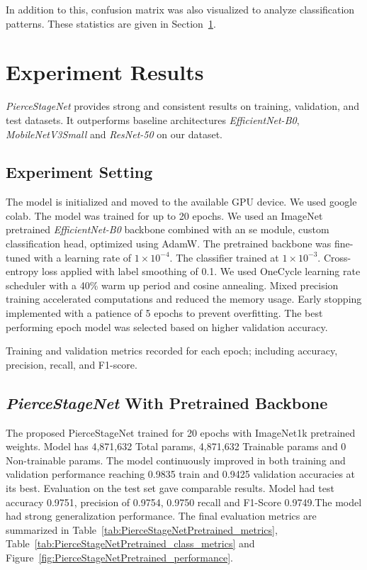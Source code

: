 \documentclass[conference]{IEEEtran}
\begin{document}
In addition to this, confusion matrix was also visualized to analyze classification patterns. These statistics are given in Section~\ref{sec:results}.

\section{Experiment Results}
\label{sec:results}
\textit{PierceStageNet} provides strong and consistent results on training, validation, and test datasets. It outperforms baseline architectures \textit{EfficientNet-B0}, \textit{MobileNetV3Small} and \textit{ResNet-50} on our dataset.

\subsection{Experiment Setting}
The model is initialized and moved to the available GPU device. We used google colab. The model was trained for up to 20 epochs. We used an ImageNet pretrained \textit{EfficientNet-B0} backbone combined with an \ac{se} module, custom classification head, optimized using AdamW. The pretrained backbone was fine-tuned with a learning rate of $1\times10^{-4}$. The classifier trained at $1\times10^{-3}$.  Cross-entropy loss applied with label smoothing of 0.1. We used OneCycle learning rate scheduler with a 40\% warm up period and cosine annealing. Mixed precision training accelerated computations and reduced the memory usage. Early stopping implemented with a patience of 5 epochs to prevent overfitting. The best performing epoch model was selected based on higher validation accuracy.

Training and validation metrics recorded for each epoch; including accuracy, precision, recall, and F1-score.

\subsection{\textit{PierceStageNet} With Pretrained Backbone}
The proposed PierceStageNet trained for 20 epochs with ImageNet1k pretrained weights. Model has 4,871,632 Total params, 4,871,632 Trainable params and 0 Non-trainable params. The model continuously improved in both training and validation performance reaching 0.9835 train and 0.9425 validation accuracies at its best. Evaluation on the test set gave comparable results. Model had test accuracy 0.9751, precision of 0.9754, 0.9750 recall and F1-Score 0.9749.The model had strong generalization performance. The final evaluation metrics are summarized in Table~\ref{tab:PierceStageNetPretrained_metrics}, Table~\ref{tab:PierceStageNetPretrained_class_metrics} and Figure~\ref{fig:PierceStageNetPretrained_performance}.
\end{document}
